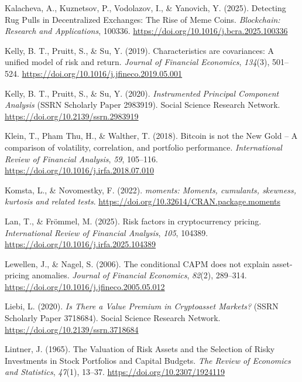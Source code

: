 \documentclass[
  12pt,
  a4paper,
  openany]{scrbook}
\newlength{\cslhangindent}
\newenvironment{CSLReferences}[2] %
 {\begin{list}{}{%
  \setlength{\itemindent}{0pt}
  \setlength{\leftmargin}{0pt}
  \setlength{\parsep}{0pt}
  \ifodd #1
   \setlength{\leftmargin}{\cslhangindent}
   \setlength{\itemindent}{-1\cslhangindent}
  \fi
  \setlength{\itemsep}{#2\baselineskip}}}
 {\end{list}}
\begin{document}
\begin{CSLReferences}{1}{0}
Kalacheva, A., Kuznetsov, P., Vodolazov, I., \& Yanovich, Y. (2025).
Detecting Rug Pulls in Decentralized Exchanges: The Rise of Meme Coins.
\emph{Blockchain: Research and Applications}, 100336.
\url{https://doi.org/10.1016/j.bcra.2025.100336}

Kelly, B. T., Pruitt, S., \& Su, Y. (2019). Characteristics are
covariances: A unified model of risk and return. \emph{Journal of
Financial Economics}, \emph{134}(3), 501--524.
\url{https://doi.org/10.1016/j.jfineco.2019.05.001}

Kelly, B. T., Pruitt, S., \& Su, Y. (2020). \emph{Instrumented Principal
Component Analysis} (SSRN Scholarly Paper 2983919). Social Science
Research Network. \url{https://doi.org/10.2139/ssrn.2983919}

Klein, T., Pham Thu, H., \& Walther, T. (2018). Bitcoin is not the New
Gold -- A comparison of volatility, correlation, and portfolio
performance. \emph{International Review of Financial Analysis},
\emph{59}, 105--116. \url{https://doi.org/10.1016/j.irfa.2018.07.010}

Komsta, L., \& Novomestky, F. (2022). \emph{{moments}: Moments,
cumulants, skewness, kurtosis and related tests}.
\url{https://doi.org/10.32614/CRAN.package.moments}

Lan, T., \& Frömmel, M. (2025). Risk factors in cryptocurrency pricing.
\emph{International Review of Financial Analysis}, \emph{105}, 104389.
\url{https://doi.org/10.1016/j.irfa.2025.104389}

Lewellen, J., \& Nagel, S. (2006). The conditional CAPM does not explain
asset-pricing anomalies. \emph{Journal of Financial Economics},
\emph{82}(2), 289--314.
\url{https://doi.org/10.1016/j.jfineco.2005.05.012}

Liebi, L. (2020). \emph{Is There a Value Premium in Cryptoasset
Markets?} (SSRN Scholarly Paper 3718684). Social Science Research
Network. \url{https://doi.org/10.2139/ssrn.3718684}

Lintner, J. (1965). The Valuation of Risk Assets and the Selection of
Risky Investments in Stock Portfolios and Capital Budgets. \emph{The
Review of Economics and Statistics}, \emph{47}(1), 13--37.
\url{https://doi.org/10.2307/1924119}


\end{CSLReferences}
\end{document}
